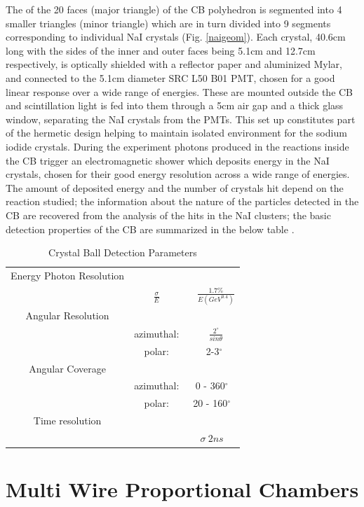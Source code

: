 \indent The of the 20 faces (major triangle) of the CB polyhedron is segmented into 4 smaller triangles (minor triangle)  which  are in turn divided into 9 segments corresponding to individual NaI crystals (Fig. \ref{naigeom}). Each crystal, 40.6cm long with the sides of the inner and outer faces being 5.1cm and 12.7cm respectively, is optically shielded with a reflector paper and aluminized Mylar, and connected to the 5.1cm diameter SRC L50 B01 PMT, chosen for a good linear response over a wide range of energies. These are mounted outside the CB and scintillation light is fed into them through a 5cm air gap and a thick glass window, separating the NaI crystals from the PMTs. This set up constitutes part of the hermetic design helping to maintain isolated environment for the sodium iodide crystals. During the experiment photons produced in the reactions inside the CB trigger an electromagnetic shower which deposits energy in the NaI crystals, chosen for their good energy resolution across a wide range of energies. The amount of deposited energy and the number of crystals hit depend on the reaction studied; the  information  about  the  nature  of  the  particles  detected  in  the  CB  are recovered from the analysis of the hits in the NaI clusters; the basic detection properties  of  the  CB  are  summarized  in  the  below  table \cite {starostin}.
 
\begin{table}[ht]
\caption{Crystal Ball Detection Parameters}
\centering
\begin{tabular}{c c c}
\hline\hline
Energy Photon Resolution & &  \\
 & $\frac{\sigma}{E}$ & ~ $\frac{1.7\%}{E(GeV^{0.4})}$ \\
\hline
Angular Resolution & & \\
 & azimuthal: & ~ $\frac{2^{\circ}}{sin\theta}$ \\
 & polar: & ~2-3$^{\circ}$ \\
\hline
Angular Coverage & & \\
 & azimuthal: & 0 - 360$^{\circ}$ \\
 & polar: & 20 - 160$^{\circ}$ \\
\hline
Time resolution & & \\
 & & $\sigma ~ 2ns$ \\ [1ex]
\hline\hline
\end{tabular}
\label{table_cbparam}
\end{table} 
 

\section{Multi Wire Proportional Chambers}

